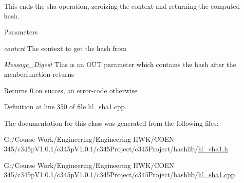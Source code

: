 This ends the sha operation, zeroizing the context and returning the computed hash. 
\begin{DoxyParams}{Parameters}
\item[{\em context}]The context to get the hash from \item[{\em Message\_\-Digest}]This is an OUT parameter which contains the hash after the menberfunction returns \end{DoxyParams}
\begin{DoxyReturn}{Returns}
0 on succes, an error-\/code otherwise 
\end{DoxyReturn}


Definition at line 350 of file hl\_\-sha1.cpp.

The documentation for this class was generated from the following files:\begin{DoxyCompactItemize}
\item 
G:/Course Work/Engineering/Engineering HWK/COEN 345/c345pV1.0.1/c345pV1.0.1/c345Project/c345Project/hashlib/\hyperlink{hl__sha1_8h}{hl\_\-sha1.h}\item 
G:/Course Work/Engineering/Engineering HWK/COEN 345/c345pV1.0.1/c345pV1.0.1/c345Project/c345Project/hashlib/\hyperlink{hl__sha1_8cpp}{hl\_\-sha1.cpp}\end{DoxyCompactItemize}
